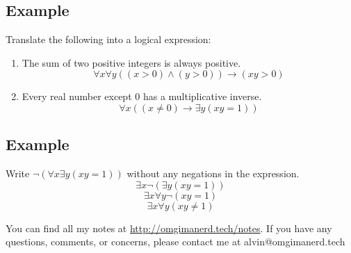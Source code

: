 \documentclass[letterpaper, 12pt]{math}
\begin{document}
\subsection*{Example}
Translate the following into a logical expression:
\begin{enumerate}
  \item The sum of two positive integers is always positive.
  \[ \forall{x}\forall{y}((x > 0) \wedge (y > 0)) \to (xy > 0) \]
  \item Every real number except 0 has a multiplicative inverse.
  \[ \forall{x}((x \neq 0) \to \exists{y}(xy = 1)) \]
\end{enumerate}

\subsection*{Example}
Write \( \neg{(\forall{x}\exists{y}(xy = 1))} \) without any negations
in the expression.
\[ \exists{x}\neg{(\exists{y}(xy=1))} \]
\[ \exists{x}\forall{y}\neg{(xy=1)} \]
\[ \exists{x}\forall{y}(xy \neq 1) \]

\begin{center}
  You can find all my notes at \url{http://omgimanerd.tech/notes}. If you have
  any questions, comments, or concerns, please contact me at
  alvin@omgimanerd.tech
\end{center}
\end{document}

